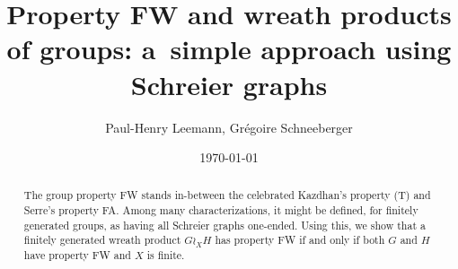 \documentclass[a4paper]{article}
\title{Property FW and wreath products of groups: a~simple approach using Schreier graphs}
\author{Paul-Henry Leemann, Grégoire Schneeberger}
\date{\today \quad \currenttime}
\theoremstyle{definition}
\theoremstyle{remark}%
\begin{document}
\maketitle
%
%
%
%
%
%
%
%
%
%
\begin{abstract}
The group property FW stands in-between the celebrated Kazdhan's property (T) and Serre's property FA. Among many characterizations, it might be defined, for finitely generated groups, as having all Schreier graphs one-ended.
Using this, we show that a finitely generated wreath product $G\wr_XH$ has property FW if and only if both $G$ and $H$ have property FW and $X$ is finite.
\end{abstract}
%
%
%
%
%
%
%
%
%
%
%
%
%
%
%



%
%
%
%
%
%
%
%
%
%


%
%
%
%
%
\enddocument
\end{document}
